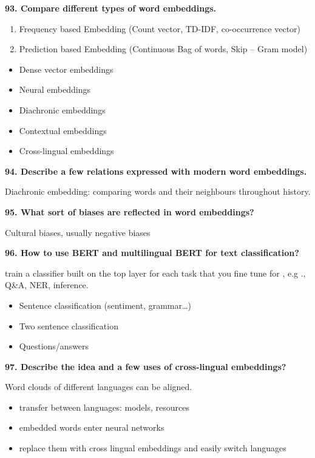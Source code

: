 \textbf{93. Compare different types of word embeddings.}

\begin{enumerate}
\def\labelenumi{\arabic{enumi}.}
\item Frequency based Embedding (Count vector, TD-IDF, co-occurrence vector)
\item Prediction based Embedding (Continuous Bag of words, Skip -- Gram
  model)
\end{enumerate}

\begin{itemize}
\item Dense vector embeddings
\item Neural embeddings
\item Diachronic embeddings
\item Contextual embeddings
\item Cross-lingual embeddings
\end{itemize}

\textbf{94. Describe a few relations expressed with modern word
embeddings.}

Diachronic embedding: comparing words and their neighbours throughout
history.

\textbf{95. What sort of biases are reflected in word embeddings?}

Cultural biases, usually negative biases

\textbf{96. How to use BERT and multilingual BERT for text
classification?}

train a classifier built on the top layer for each task that you fine
tune for , e.g ., Q\&A, NER, inference.

\begin{itemize}
\item Sentence classification (sentiment, grammar\ldots)
\item Two sentence classification
\item Questions/answers
\end{itemize}


\textbf{97. Describe the idea and a few uses of cross-lingual
embeddings?}

Word clouds of different languages can be aligned.

\begin{itemize}
\item transfer between languages: models, resources
\item embedded words enter neural networks
\item replace them with cross lingual embeddings and easily switch languages
\end{itemize}

